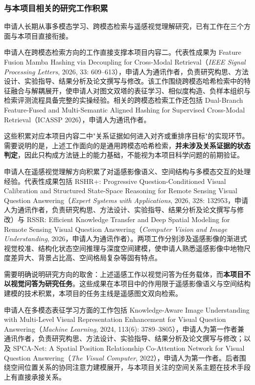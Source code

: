 \justifying
\NSFCBodyText

\subsubsection{与本项目相关的研究工作积累}

申请人长期从事多模态学习、跨模态检索与遥感视觉理解研究，已有工作在三个方面与本项目直接衔接。


申请人在跨模态检索方向的工作直接支撑本项目内容二。代表性成果为 Feature Fusion Mamba Hashing via Decoupling for Cross-Modal Retrieval（\textit{IEEE Signal Processing Letters}, 2026, 33: 609--613），申请人为通讯作者，负责研究构思、方法设计、实验指导、结果分析及论文撰写与修改。该工作围绕跨模态哈希检索中的特征融合与解耦展开，使申请人对图文双塔的表征学习、相似度构造、负样本组织与检索评测流程具备完整的实操经验。相关的跨模态检索工作还包括 Dual-Branch Feature-Fused and Multi-Semantic Aligned Hashing for Supervised Cross-Modal Retrieval（ICASSP 2026），申请人为通讯作者。

这些积累对应本项目内容二中"关系证据如何进入对齐或重排序目标"的实现环节。需要说明的是，上述工作面向的是通用跨模态哈希检索，\textbf{并未涉及关系证据的状态判定}，因此只构成方法链上的能力基础，不能视为本项目科学问题的前期验证。


申请人在遥感视觉理解方向积累了对遥感影像语义、空间结构与多模态交互的处理经验。代表性成果包括 RSHR+: Progressive Question-Conditioned Visual Calibration and Structured State-Space Reasoning for Remote Sensing Visual Question Answering（\textit{Expert Systems with Applications}, 2026, 328: 132953，申请人为通讯作者，负责研究构思、方法设计、实验指导、结果分析及论文撰写与修改）与 RSSR: Efficient Knowledge Transfer and Deep Spatial Modeling for Remote Sensing Visual Question Answering（\textit{Computer Vision and Image Understanding}, 2026，申请人为通讯作者）。两项工作分别涉及遥感影像的渐进式视觉校准、结构化状态空间推理与深度空间建模，使申请人熟悉遥感影像中地物尺度差异大、背景占比高、空间格局复杂等固有特点。

需要明确说明研究方向的取舍：上述遥感工作以视觉问答为任务载体，而\textbf{本项目不以视觉问答为研究任务}。这些成果在本项目中的作用限于遥感影像语义与空间结构建模的技术积累，本项目的任务主线是遥感图文双向检索。


申请人在多模态表征学习方面的工作包括 Knowledge-Aware Image Understanding with Multi-Level Visual Representation Enhancement for Visual Question Answering（\textit{Machine Learning}, 2024, 113(6): 3789--3805），申请人为第一作者兼通讯作者，负责研究构思、方法设计、实验指导、结果分析及论文撰写与修改；以及 SPCA-Net: A Spatial Position Relationship Co-Attention Network for Visual Question Answering（\textit{The Visual Computer}, 2022），申请人为第一作者。后者围绕空间位置关系的协同注意力建模展开，与本项目关注的空间关系主题在技术手段上有直接承接关系。

